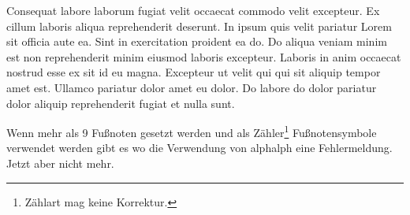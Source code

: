 \documentclass{scrreprt}
\begin{document}
Consequat labore laborum fugiat velit occaecat commodo velit excepteur. Ex cillum laboris aliqua reprehenderit deserunt. In ipsum quis velit pariatur Lorem sit officia aute ea. Sint in exercitation proident ea do. Do aliqua veniam minim est non reprehenderit minim eiusmod laboris excepteur. Laboris in anim occaecat nostrud esse ex sit id eu magna. Excepteur ut velit qui qui sit aliquip tempor amet est. Ullamco pariatur dolor amet eu dolor. Do labore do dolor pariatur dolor aliquip reprehenderit fugiat et nulla sunt.

\begin{minipage}{\linewidth}
	
\end{minipage}

\setcounter{footnote}{9}
Wenn mehr als 9 Fußnoten gesetzt werden und als Zähler\footnote{Zählart
	mag keine Korrektur.} Fußnotensymbole verwendet werden gibt es wo die
Verwendung von alphalph eine Fehlermeldung. Jetzt aber nicht mehr.

\printbibliography[title={Literatur}]
\listoffigures

\end{document}
